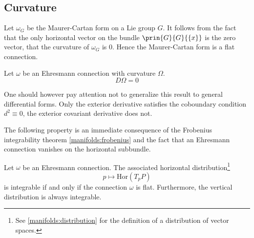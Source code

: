 \subsection{Curvature}

	\begin{example}
		Let $\omega_G$ be the Maurer-Cartan form on a Lie group $G$. It follows from the fact that the only horizontal vector on the bundle $\prin{G}{G}{\{x\}}$ is the zero vector, that the curvature of $\omega_G$ is 0. Hence the Maurer-Cartan form is a flat connection.
	\end{example}
	
	\begin{property}
		Let $\omega$ be an Ehresmann connection with curvature $\Omega$.
		\begin{equation}
			\boxed{D\Omega = 0}
		\end{equation}
	\end{property}
	\begin{remark}
		One should however pay attention not to generalize this result\mnote{\dbend} to general differential forms. Only the exterior derivative satisfies the coboundary condition $d^2 \equiv 0$, the exterior covariant derivative does not.
	\end{remark}
	
	
	The following property is an immediate consequence of the Frobenius integrability theorem \ref{manifolds:frobenius} and the fact that an Ehresmann connection vanishes on the horizontal subbundle.
	\begin{property}
		Let $\omega$ be an Ehresmann connection. The associated horizontal distribution\footnote{See \ref{manifolds:distribution} for the definition of a distribution of vector spaces.}\[p\mapsto\text{Hor}(T_pP)\]is integrable if and only if the connection $\omega$ is flat. Furthermore, the vertical distribution is always integrable.
	\end{property}
	
